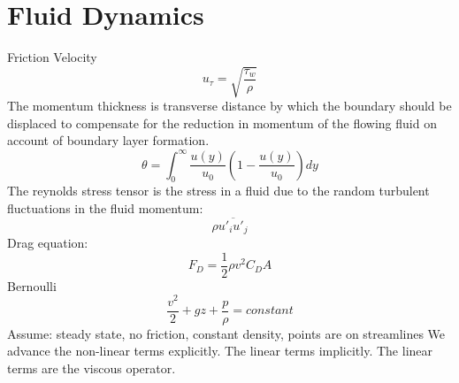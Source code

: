 \documentclass{article}
\begin{document}
\section{Fluid Dynamics}
Friction Velocity
\begin{equation}
  u_\tau = \sqrt{\frac{\tau_w}{\rho}}
\end{equation}
\newline
\newline
The momentum thickness is transverse distance by which the boundary should be displaced to compensate for the reduction in momentum of the flowing fluid on account of boundary layer formation. 
\begin{equation}
  \theta = \int^\infty_0 \frac{u(y)}{u_0}(1-\frac{u(y)}{u_0})dy
\end{equation}
\newline
\newline
The reynolds stress tensor is the stress in a fluid due to the random turbulent fluctuations in the fluid momentum:
\begin{equation}
  \rho \overline{u'_i u'_j}
\end{equation}
\newline
\newline
Drag equation: 
\begin{equation}
  F_D = \frac{1}{2}\rho v^2 C_D A
\end{equation}
\newline
\newline
Bernoulli 
\begin{equation}
  \frac{v^2}{2}+gz+\frac{p}{\rho}=constant
\end{equation}
\newline
Assume: steady state, no friction, constant density, points are on streamlines
\newline
\newline
We advance the non-linear terms explicitly. The linear terms
implicitly. The linear terms are the viscous operator. 

%
%
\newpage
\end{document}
